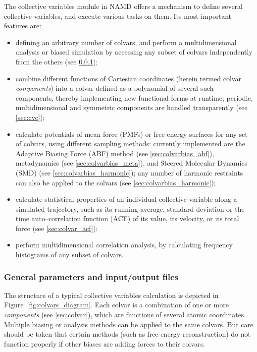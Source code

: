 The collective variables module in NAMD offers a mechanism to define
several collective variables, and execute various tasks on them.
Its most important features are:
\begin{itemize}
\item defining an arbitrary number of colvars, and perform a
  multidimensional analysis or biased simulation by accessing any
  subset of colvars independently from the others (see
  \ref{sec:colvarmodule});
\item combine different functions of Cartesian coordinates
  (herein termed colvar \emph{components}) into a colvar
  defined as a polynomial of several such components, thereby
  implementing new functional forms at runtime; periodic,
  multidimensional and symmetric components are handled transparently
  (see \ref{sec:cvc});
\item calculate potentials of mean force (PMFs) or free energy
  surfaces for any set of colvars, using different sampling methods:
  currently implemented are the Adaptive Biasing Force (ABF)
  method (see \ref{sec:colvarbias_abf}), metadynamics (see
  \ref{sec:colvarbias_meta}), and Steered Molecular Dynamics (SMD)
  (see \ref{sec:colvarbias_harmonic}); any number of harmonic
  restraints can also be applied to the colvars (see
  \ref{sec:colvarbias_harmonic});
\item calculate statistical properties of an individual collective
  variable along a simulated trajectory, such as its running average,
  standard deviation or the time auto--correlation function (ACF)
  of its value, its velocity, or its total force (see
  \ref{sec:colvar_acf});
\item perform multidimensional correlation analysis, by calculating
  frequency histograms of any subset of colvars.
\end{itemize}


\subsubsection{General parameters and input/output files}
\label{sec:colvarmodule}

The structure of a typical collective variables calculation is
depicted in Figure~\ref{fig:colvars_diagram}.  Each colvar is a
combination of one or more \emph{components} (see \ref{sec:colvar}),
which are functions of several atomic coordinates.  Multiple biasing
or analysis methods can be applied to the same colvars.  But care
should be taken that certain methods (such as free energy
reconstruction) do not function properly if other biases are adding
forces to their colvars.

